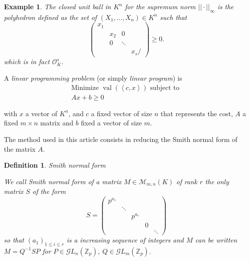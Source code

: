\documentclass[a4paper,12pt]{article}
\newtheorem{definition}{Definition}
\newtheorem{example}{Example}
\DeclareMathOperator{\val}{val}
\def\ZZ{\ensuremath{\mathbb{Z}}}
\newcommand{\OK}{\mathcal{O}_K}
\begin{document}
\begin{example}
  The closed unit ball in $K^n$ for the supremum norm $||\cdot||_{\infty}$ is the polyhedron defined as
  the set of $(X_1,\ldots,X_n) \in K^n$ such that
  $$
  \begin{pmatrix} x_1 &  & & \\
    & x_2 &0 &  \\
    &  0& \ddots & \\
    &  & & x_s/
  \end{pmatrix} \ge 0.$$ which is in fact $\OK^s$.
\end{example}


A {\it linear programming problem} (or simply {\it linear program}) is
\begin{equation}
  \tag{LP}
  \begin{matrix}
    \text{Minimize } \val\left(\left<c,x \right>\right) \text{ subject to }\\
    Ax + b \ge 0
  \end{matrix}
  \label{eqn:Proglinp}
\end{equation}

with $x$ a vector of $K ^n$, and $c$ a fixed vector of size $n$ that represents the cost, $A$ a fixed $m \times n $ matrix and $b$ fixed a vector of size $m$.

The method used in this article consists in reducing the Smith normal form of the matrix $A$.

\begin{definition} Smith normal form
	
	We call {\it Smith normal form} of a matrix $M \in \mathcal{M}_{m,n}\left(K \right) $ of rank $r$ the only matrix $S$ of the form $$S =  
	\begin{pmatrix} p^{a_1} & \\
		& \ddots \\
		& & p^{a_r}\\
		& & & 0\\
		& & & & \ddots \end{pmatrix} $$
	so that $(a_1)_{1\le i\le r}$ is a increasing sequence of integers and $M$ can be written $M =  Q^{-1} S P$ for $P \in \mathcal{G}L_n\left( \ZZ_p \right) $, $Q \in \mathcal{G}L_m\left( \ZZ_p \right) $.
\end{definition}
\end{document}
